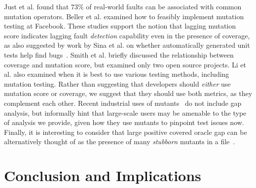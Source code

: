 \documentclass[sigconf,review, anonymous]{acmart}
\begin{document}
\begin{comment}
Delgado-Pérez et al. \cite{DelgadoPerezCaseStudy} also performed mutation testing on 2,509 mutants over 15 functions. Their study 
primarily focused on analyzing equivalent mutants and the computational cost of finding these mutants.
They agree with the hypothesis that mutation testing is a better predictor of faults than a
traditional coverage based approach. This large scale study of mutation is similar to our Java study of a large number of
mutants, however the analysis and results differ in that they were analyzing equivalent mutants, while we are examining the
correlation between mutation score and coverage through the lens of the oracle gap. Additionally, our study is over a much 
larger sample size, with over 30 Java projects, that total have 463,417 lines of code, making it more appropriate for extrapolating
generalizable correlations.
\end{comment}

Just et al. \cite{JustMutationFault} found that 73\% of real-world faults can be associated with common mutation
operators. Beller et al. \cite{BellerFacebookMutation} examined how to feasibly
implement mutation testing at Facebook. These studies support the notion that
lagging mutation score indicates lagging fault \emph{detection}
capability even in the presence of coverage, as also suggested by work
by Sina et al. on whether automatically generated unit tests help find bugs~\cite{DoGenerated}.
Smith et al. \cite{SmithCoverageMutation} briefly discussed the
relationship between coverage and mutation score, but 
examined only two open source projects. Li et al. \cite{LiCoverageMutation} also examined when it is best to use various testing methods, including mutation testing. Rather than suggesting
that developers should \emph{either} use mutation score or coverage, we suggest that they should use both metrics, as they
complement each other.  Recent industrial uses of
mutants~\cite{PetrovicMutationGoogle,BellerFacebookMutation} do not
include gap analysis, but informally hint that large-scale users may
be amenable to the type of analysis we provide, given how they use
mutants to pinpoint test issues now.  Finally, it is interesting to consider that
large positive covered oracle gap can be alternatively thought of as
the presence of many \emph{stubborn} mutants in a file~\cite{papadakis2018mutant}.


\section{Conclusion and Implications}



\end{document}
